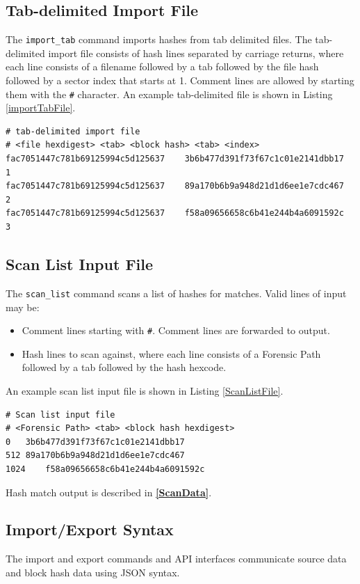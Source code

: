 \documentclass[11pt,fleqn]{article} %
\begin{document}
\subsection{Tab-delimited Import File}
The \verb+import_tab+ command imports hashes from tab delimited files.
The tab-delimited import file consists of hash lines separated by carriage returns, where each line consists of a filename followed by a tab followed by the file hash followed by a sector index that starts at 1.  Comment lines are allowed by starting them with the \texttt{\#} character.
An example tab-delimited file is shown in Listing \ref{importTabFile}.\\

\lstset{style=customfile}
\begin{lstlisting}[caption={Example tab-delimited import file}, label=importTabFile]
# tab-delimited import file
# <file hexdigest> <tab> <block hash> <tab> <index>
fac7051447c781b69125994c5d125637    3b6b477d391f73f67c1c01e2141dbb17    1
fac7051447c781b69125994c5d125637    89a170b6b9a948d21d1d6ee1e7cdc467    2
fac7051447c781b69125994c5d125637    f58a09656658c6b41e244b4a6091592c    3
\end{lstlisting}

\subsection{Scan List Input File}
The \verb+scan_list+ command scans a list of hashes for matches.  Valid lines of input may be:
\begin{itemize}
\item Comment lines starting with \verb+#+.  Comment lines are forwarded to output.
\item Hash lines to scan against, where each line consists of a Forensic Path followed by a tab followed by the hash hexcode.
\end{itemize}
An example scan list input file is shown in Listing \ref{ScanListFile}.\\

\lstset{style=customfile}
\begin{lstlisting}[caption={Example scan list input file}, label=ScanListFile]
# Scan list input file
# <Forensic Path> <tab> <block hash hexdigest>
0	3b6b477d391f73f67c1c01e2141dbb17
512	89a170b6b9a948d21d1d6ee1e7cdc467
1024	f58a09656658c6b41e244b4a6091592c
\end{lstlisting}

Hash match output is described in \textbf{\autoref{ScanData}}.
\subsection{Import/Export Syntax}
The import and export commands and API interfaces communicate source data and block hash data using JSON syntax.\\
\end{document}
